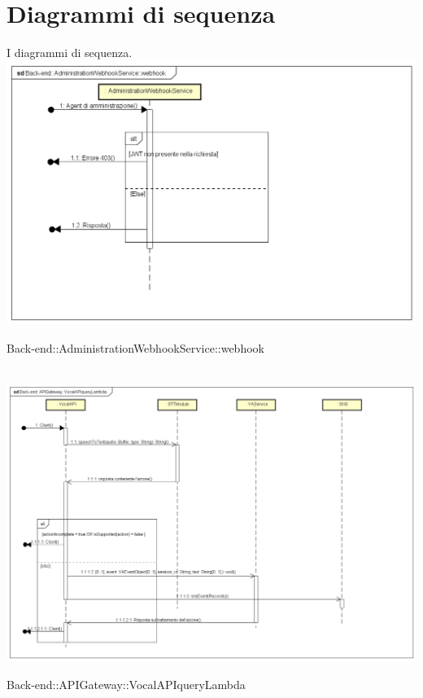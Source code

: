 \section{Diagrammi di sequenza}
I diagrammi di sequenza.\\
\includegraphics[width=\textwidth,height=\textheight,keepaspectratio]{images/diagrams/back-end/Ufficial_Backend/Back-end__AdministrationWebhookService__webhook.png}
\caption{Back-end::AdministrationWebhookService::webhook}
\\
 \includegraphics[width=\textwidth,height=\textheight,keepaspectratio]{images/diagrams/back-end/Ufficial_Backend/Back-end__APIGateway__VocalAPIqueryLambda.png}
 \caption{Back-end::APIGateway::VocalAPIqueryLambda}
